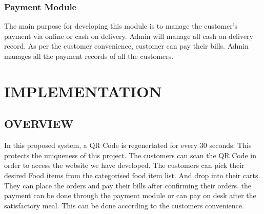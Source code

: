 \documentclass[12pt,a4paper]{report}
\begin{document}
\subsection{Payment Module }
\hspace{0.25cm}
\par
The main purpose for developing this module is to manage the customer's payment via online or cash on delivery. Admin will manage all cash on delivery record. As per the customer convenience, customer can pay their bills. Admin manages all the payment records of all the customers. 



\chapter{IMPLEMENTATION}
\section{OVERVIEW}
\hspace{0.25cm}
\par
In this proposed system, a QR Code is regenertated for every 30 seconds. This protects the uniqueness of this project. The customers can scan the QR Code in order to access the website we have developed. The customers can pick their desired Food items from the categorised food item list. And drop into their carts. They can place the orders and pay their bills after confirming their orders. the payment can be done through the payment module or can pay on desk after the satisfactory meal. This can be done according to the customers convenience.
\end{document}
